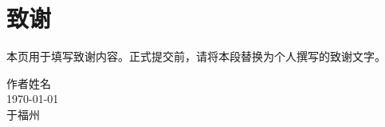 \chapter{致\texorpdfstring{\qquad}{}谢}

本页用于填写致谢内容。正式提交前，请将本段替换为个人撰写的致谢文字。

\begin{minipage}[t]{0.945\textwidth}
  \begin{flushright}
    作者姓名\\
    \today\\
    于福州
    \par
  \end{flushright}
\end{minipage}
